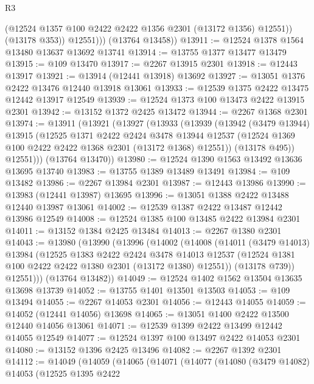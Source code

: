 \begin{lexlean}{R3}
\begin{coremodule}
                (@12524 @1357 @100 @2422 @2422 @1356 @2301 (@13172 @1356) @12551))
              (@13178 @353))
            @12551)))
      (@13764 @13458))
@13911 := @12524 @1378 @1564 @13480 @13637 @13692 @13741
@13914 := @13755 @1377 @13477 @13479
@13915 := @109 @13470
@13917 := @2267 @13915 @2301
@13918 := @12443 @13917
@13921 := @13914 (@12441 @13918) @13692
@13927 := @13051 @1376 @2422 @13476 @12440 @13918 @13061
@13933 := @12539 @1375 @2422 @13475 @12442 @13917 @12549
@13939 := @12524 @1373 @100 @13473 @2422 @13915 @2301
@13942 := @13152 @1372 @2425 @13472
@13944 := @2267 @1368 @2301
@13974 := @13911
    (@13921
      (@13927
        (@13933
          (@13939
            (@13942
              (@3479 @13944)
              @13915
              (@12525
                @1371
                @2422
                @2424
                @3478
                @13944
                @12537
                (@12524 @1369 @100 @2422 @2422 @1368 @2301 (@13172 @1368) @12551))
              (@13178 @495))
            @12551)))
      (@13764 @13470))
@13980 := @12524 @1390 @1563 @13492 @13636 @13695 @13740
@13983 := @13755 @1389 @13489 @13491
@13984 := @109 @13482
@13986 := @2267 @13984 @2301
@13987 := @12443 @13986
@13990 := @13983 (@12441 @13987) @13695
@13996 := @13051 @1388 @2422 @13488 @12440 @13987 @13061
@14002 := @12539 @1387 @2422 @13487 @12442 @13986 @12549
@14008 := @12524 @1385 @100 @13485 @2422 @13984 @2301
@14011 := @13152 @1384 @2425 @13484
@14013 := @2267 @1380 @2301
@14043 := @13980
    (@13990
      (@13996
        (@14002
          (@14008
            (@14011
              (@3479 @14013)
              @13984
              (@12525
                @1383
                @2422
                @2424
                @3478
                @14013
                @12537
                (@12524 @1381 @100 @2422 @2422 @1380 @2301 (@13172 @1380) @12551))
              (@13178 @739))
            @12551)))
      (@13764 @13482))
@14049 := @12524 @1402 @1562 @13504 @13635 @13698 @13739
@14052 := @13755 @1401 @13501 @13503
@14053 := @109 @13494
@14055 := @2267 @14053 @2301
@14056 := @12443 @14055
@14059 := @14052 (@12441 @14056) @13698
@14065 := @13051 @1400 @2422 @13500 @12440 @14056 @13061
@14071 := @12539 @1399 @2422 @13499 @12442 @14055 @12549
@14077 := @12524 @1397 @100 @13497 @2422 @14053 @2301
@14080 := @13152 @1396 @2425 @13496
@14082 := @2267 @1392 @2301
@14112 := @14049
    (@14059
      (@14065
        (@14071
          (@14077
            (@14080
              (@3479 @14082)
              @14053
              (@12525
                @1395
                @2422

\end{coremodule}
\end{lexlean}
